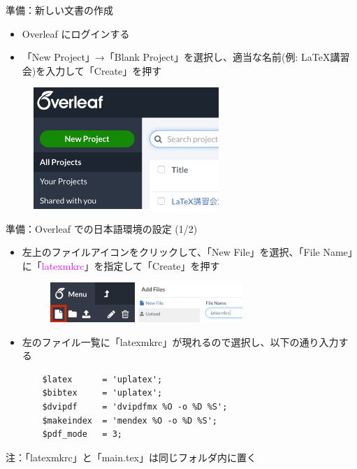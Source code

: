 \documentclass[dvipdfmx]{beamer}
\begin{document}
\begin{frame}[fragile]{準備：新しい文書の作成}
\begin{itemize}
    \item Overleaf にログインする
    \item 「New Project」→「Blank Project」を選択し、適当な名前(例: LaTeX講習会)を入力して「Create」を押す
\end{itemize}
\begin{figure}
    \centering
    \includegraphics[width=7cm,pagebox=cropbox,clip]{./figures/NewDocument.pdf}
\end{figure}
\end{frame}

\begin{frame}[fragile]{準備：Overleaf での日本語環境の設定 (1/2)}
\begin{itemize}
    \item 左上のファイルアイコンをクリックして、「New File」を選択、「File Name」に「\textcolor{magenta}{latexmkrc}」を指定して「Create」を押す
    \begin{figure}
        \centering
        \includegraphics[height=1.5cm]{./figures/fig_new_file.jpg}
        \qquad
        \includegraphics[height=1.5cm]{./figures/fig_latexmkrc.pdf}
    \end{figure}
    
    \item 左のファイル一覧に「latexmkrc」が現れるので選択し、以下の通り入力する
    \begin{verbatim}
    $latex      = 'uplatex';
    $bibtex     = 'uplatex';
    $dvipdf     = 'dvipdfmx %O -o %D %S';
    $makeindex  = 'mendex %O -o %D %S';
    $pdf_mode   = 3; 
    \end{verbatim}
\end{itemize}
\alert{注}：「latexmkrc」と「main.tex」は同じフォルダ内に置く
\end{frame}
\end{document}
